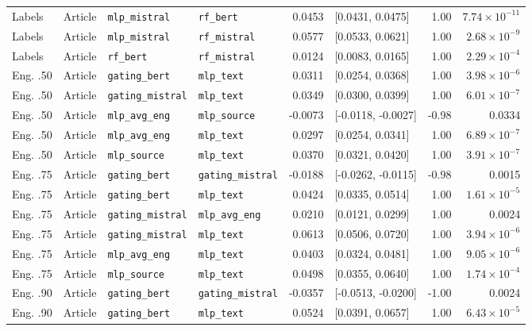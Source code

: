\documentclass[10pt,letterpaper]{article}
\begin{document}
\begin{longtable}{llllrlrr}
Labels & Article & \texttt{mlp\_mistral} & \texttt{rf\_bert} & 0.0453 & [0.0431, 0.0475] & 1.00 & $7.74\times10^{-11}$ \\
Labels & Article & \texttt{mlp\_mistral} & \texttt{rf\_mistral} & 0.0577 & [0.0533, 0.0621] & 1.00 & $2.68\times10^{-9}$ \\
Labels & Article & \texttt{rf\_bert} & \texttt{rf\_mistral} & 0.0124 & [0.0083, 0.0165] & 1.00 & $2.29\times10^{-4}$ \\
Eng. .50 & Article & \texttt{gating\_bert} & \texttt{mlp\_text} & 0.0311 & [0.0254, 0.0368] & 1.00 & $3.98\times10^{-6}$ \\
Eng. .50 & Article & \texttt{gating\_mistral} & \texttt{mlp\_text} & 0.0349 & [0.0300, 0.0399] & 1.00 & $6.01\times10^{-7}$ \\
Eng. .50 & Article & \texttt{mlp\_avg\_eng} & \texttt{mlp\_source} & -0.0073 & [-0.0118, -0.0027] & -0.98 & 0.0334 \\
Eng. .50 & Article & \texttt{mlp\_avg\_eng} & \texttt{mlp\_text} & 0.0297 & [0.0254, 0.0341] & 1.00 & $6.89\times10^{-7}$ \\
Eng. .50 & Article & \texttt{mlp\_source} & \texttt{mlp\_text} & 0.0370 & [0.0321, 0.0420] & 1.00 & $3.91\times10^{-7}$ \\
Eng. .75 & Article & \texttt{gating\_bert} & \texttt{gating\_mistral} & -0.0188 & [-0.0262, -0.0115] & -0.98 & 0.0015 \\
Eng. .75 & Article & \texttt{gating\_bert} & \texttt{mlp\_text} & 0.0424 & [0.0335, 0.0514] & 1.00 & $1.61\times10^{-5}$ \\
Eng. .75 & Article & \texttt{gating\_mistral} & \texttt{mlp\_avg\_eng} & 0.0210 & [0.0121, 0.0299] & 1.00 & 0.0024 \\
Eng. .75 & Article & \texttt{gating\_mistral} & \texttt{mlp\_text} & 0.0613 & [0.0506, 0.0720] & 1.00 & $3.94\times10^{-6}$ \\
Eng. .75 & Article & \texttt{mlp\_avg\_eng} & \texttt{mlp\_text} & 0.0403 & [0.0324, 0.0481] & 1.00 & $9.05\times10^{-6}$ \\
Eng. .75 & Article & \texttt{mlp\_source} & \texttt{mlp\_text} & 0.0498 & [0.0355, 0.0640] & 1.00 & $1.74\times10^{-4}$ \\
Eng. .90 & Article & \texttt{gating\_bert} & \texttt{gating\_mistral} & -0.0357 & [-0.0513, -0.0200] & -1.00 & 0.0024 \\
Eng. .90 & Article & \texttt{gating\_bert} & \texttt{mlp\_text} & 0.0524 & [0.0391, 0.0657] & 1.00 & $6.43\times10^{-5}$ \\

\end{longtable}
\end{document}

